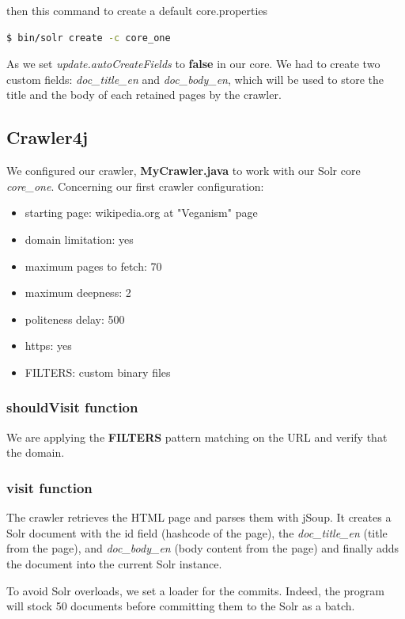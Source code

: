 \documentclass[a4paper]{article}
\begin{document}
then this command to create a default core.properties

\begin{lstlisting}[language=sh]
$ bin/solr create -c core_one
\end{lstlisting}

As we set \textit{update.autoCreateFields} to \textbf{false} in our core. We had to create two custom fields: \textit{doc\_title\_en} and \textit{doc\_body\_en}, which will be used to store the title and the body of each retained pages by the crawler.
\\
\subsection{Crawler4j}
We configured our crawler, \textbf{MyCrawler.java} to work with our Solr core \textit{core\_one}. Concerning our first crawler configuration:\\

\begin{itemize}  
\item starting page: wikipedia.org at "Veganism" page
\item domain limitation: yes
\item maximum pages to fetch: 70
\item maximum deepness: 2
\item politeness delay: 500
\item https: yes
\item FILTERS: custom binary files
\end{itemize}

\subsubsection{shouldVisit function}
We are applying the \textbf{FILTERS} pattern matching on the URL and verify that the domain.

\subsubsection{visit function}

The crawler retrieves the HTML page and parses them with jSoup. It creates a Solr document with the id field (hashcode of the page), the \textit{doc\_title\_en} (title from the page), and \textit{doc\_body\_en} (body content from the page) and finally adds the document into the current Solr instance.

To avoid Solr overloads, we set a loader for the commits. Indeed, the program will stock 50 documents before committing them to the Solr as a batch.
\end{document}
